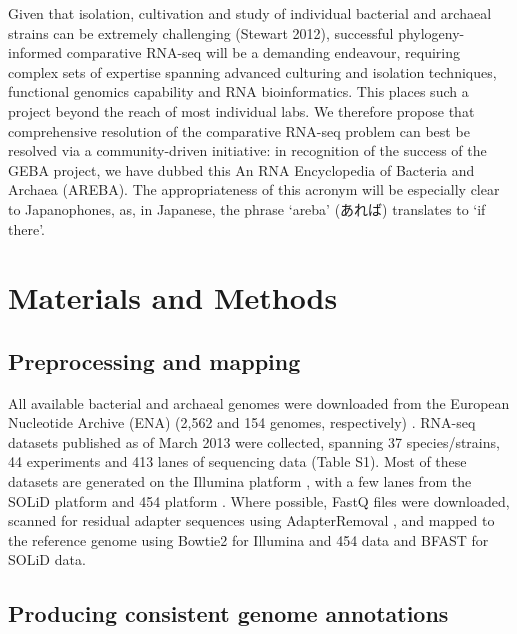 \documentclass[10pt]{article}
\begin{document}
\begin{CJK}{UTF8}{min}
Given that isolation, cultivation and study of individual bacterial
and archaeal strains can be extremely challenging (Stewart 2012),
successful phylogeny-informed comparative RNA-seq will be a demanding
endeavour, requiring complex sets of expertise spanning advanced
culturing and isolation techniques, functional genomics capability and
RNA bioinformatics. This places such a project beyond the reach of
most individual labs. We therefore propose that comprehensive
resolution of the comparative RNA-seq problem can best be resolved via
a community-driven initiative: in recognition of the success of the
GEBA project, we have dubbed this An RNA Encyclopedia of Bacteria and
Archaea (AREBA). The appropriateness of this acronym will be
especially clear to Japanophones, as, in Japanese, the phrase ‘areba’
(あれば) translates to ‘if there’.
\end{CJK}

\section*{Materials and Methods}

\subsection*{Preprocessing and mapping}

All available bacterial and archaeal genomes were downloaded from the
European Nucleotide Archive (ENA) (2,562 and 154 genomes,
respectively) \cite{Cochrane:2013}. RNA-seq datasets published as of
March 2013 were collected, spanning 37 species/strains, 44 experiments
and 413 lanes of sequencing data (Table S1). Most of these datasets
are generated on the Illumina platform \cite{Shendure:2005}, with a
few lanes from the SOLiD platform \cite{Valouev:2008} and 454
platform \cite{Margulies:2005}. Where possible, FastQ files were
downloaded, scanned for residual adapter sequences using
AdapterRemoval \cite{Lindgreen:2012}, and mapped to the reference genome
using Bowtie2 \cite{Langmead:2012} for Illumina and 454 data
and BFAST \cite{Homer:2009} for SOLiD data.

\subsection*{Producing consistent genome annotations}
\end{document}
